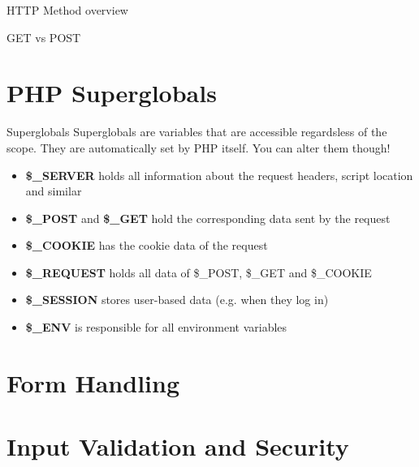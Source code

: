 \begin{frame}{HTTP Method overview}
\end{frame}

\begin{frame}{GET vs POST}
\end{frame}

\section{PHP Superglobals}

\begin{frame}[fragile]{Superglobals}
Superglobals are variables that are accessible regardsless of the scope. They are automatically set by PHP itself. You can alter them though!
	\pause
	
	\begin{itemize}
        \item \textbf{\$\_{}SERVER} holds all information about the request headers, script location and similar	
        \pause
		\item \textbf{\$\_{}POST} and \textbf{\$\_{}GET} hold the corresponding data sent by the request
		\pause
		\item \textbf{\$\_{}COOKIE} has the cookie data of the request
		\pause
		\item \textbf{\$\_{}REQUEST} holds all data of \$\_{}POST, \$\_{}GET and \$\_{}COOKIE
		\pause
		\item \textbf{\$\_{}SESSION} stores user-based data (e.g. when they log in)
		\pause
		\item \textbf{\$\_{}ENV} is responsible for all environment variables
		
	\end{itemize}
\end{frame}

\section{Form Handling}

\section{Input Validation and Security}



